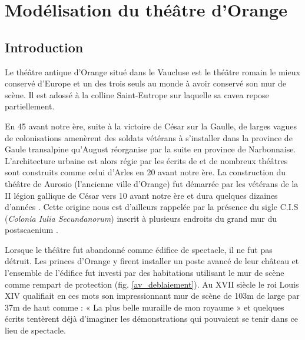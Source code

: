 \part{Modélisation du théâtre d’Orange}

	\chapter*{Introduction}
	  \label{introarcheo}
	 
			 Le théâtre antique d'Orange situé dans le Vaucluse est le théâtre romain le mieux conservé d'Europe et un des trois seuls au monde à avoir conservé son mur de scène. Il est adossé à la colline Saint-Eutrope sur laquelle sa \gls{cavea} repose partiellement.
			 
			 En 45 avant notre ère, suite à la victoire de César sur la Gaulle, de larges vagues de colonisations amenèrent des soldats vétérans à s'installer dans la province de Gaule transalpine qu'August réorganise par la suite en province de Narbonnaise. L'architecture urbaine est alors régie par les écrits de \cite{vitruve} et de nombreux théâtres sont construits comme celui d'Arles en 20 avant notre ère. La construction du théâtre de Aurosio (l'ancienne ville d'Orange) fut démarrée par les vétérans de la II légion gallique de César vers 10 avant notre ère et dura quelques dizaines d'années \citep{PouvoirDuTheatre}. Cette origine nous est d'ailleurs rappelée par la présence du sigle C.I.S (\textit{Colonia Iulia Secundanorum}) inscrit à plusieurs endroits du grand mur du \gls{postscaenium} \cite{formige}. 
			 
			 Lorsque le théâtre fut abandonné comme édifice de spectacle, il ne fut pas détruit. Les princes d'Orange y firent installer un poste avancé de leur château et l’ensemble de l’édifice fut investi par des habitations utilisant le mur de scène comme rempart de protection (fig. \ref{av_deblaiement}). Au XVII siècle le roi Louis XIV qualifiait en ces mots son impressionnant mur de scène de 103m de large par 37m de haut comme : « La plus belle muraille de mon royaume » et quelques écrits tentèrent déjà d'imaginer les démonstrations qui pouvaient se tenir dans ce lieu de spectacle. 
			 

